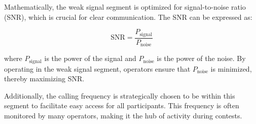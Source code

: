 Mathematically, the weak signal segment is optimized for signal-to-noise ratio (SNR), which is crucial for clear communication. The SNR can be expressed as:

\[
\text{SNR} = \frac{P_{\text{signal}}}{P_{\text{noise}}}
\]

where \( P_{\text{signal}} \) is the power of the signal and \( P_{\text{noise}} \) is the power of the noise. By operating in the weak signal segment, operators ensure that \( P_{\text{noise}} \) is minimized, thereby maximizing SNR.

Additionally, the calling frequency is strategically chosen to be within this segment to facilitate easy access for all participants. This frequency is often monitored by many operators, making it the hub of activity during contests.

